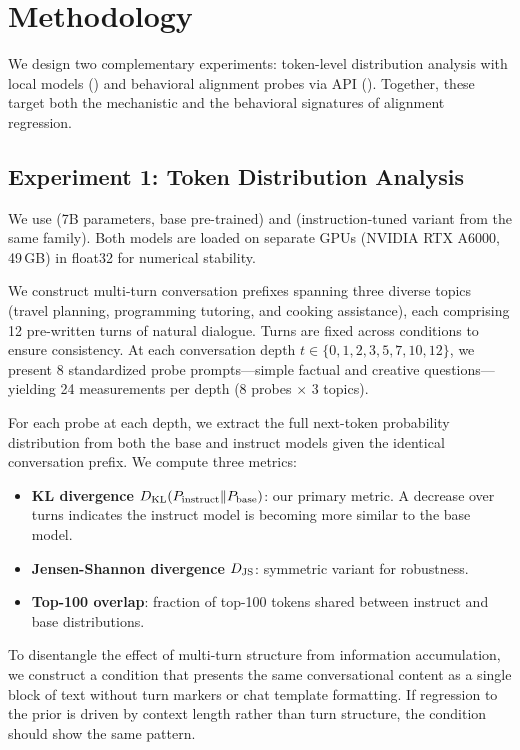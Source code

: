 \section{Methodology}
\label{sec:method}

We design two complementary experiments: token-level distribution analysis with local models () and behavioral alignment probes via API (). Together, these target both the mechanistic and the behavioral signatures of alignment regression.

\subsection{Experiment 1: Token Distribution Analysis}
\label{sec:exp1}

 We use \qwenbase (7B parameters, base pre-trained) and \qweninst (instruction-tuned variant from the same family). Both models are loaded on separate GPUs (NVIDIA RTX A6000, 49\,GB) in float32 for numerical stability.

 We construct multi-turn conversation prefixes spanning three diverse topics (travel planning, programming tutoring, and cooking assistance), each comprising 12 pre-written turns of natural dialogue. Turns are fixed across conditions to ensure consistency. At each conversation depth $t \in \{0, 1, 2, 3, 5, 7, 10, 12\}$, we present 8 standardized probe prompts---simple factual and creative questions---yielding 24 measurements per depth (8 probes $\times$ 3 topics).

 For each probe at each depth, we extract the full next-token probability distribution from both the base and instruct models given the identical conversation prefix. We compute three metrics:
\begin{itemize}[leftmargin=*,itemsep=0pt,topsep=2pt]
    \item \textbf{KL divergence} $D_{\mathrm{KL}}(P_{\text{instruct}} \| P_{\text{base}})$: our primary metric. A decrease over turns indicates the instruct model is becoming more similar to the base model.
    \item \textbf{Jensen-Shannon divergence} $D_{\mathrm{JS}}$: symmetric variant for robustness.
    \item \textbf{Top-100 overlap}: fraction of top-100 tokens shared between instruct and base distributions.
\end{itemize}

 To disentangle the effect of multi-turn structure from information accumulation, we construct a \concat condition that presents the same conversational content as a single block of text without turn markers or chat template formatting. If regression to the prior is driven by context length rather than turn structure, the \concat condition should show the same pattern.

